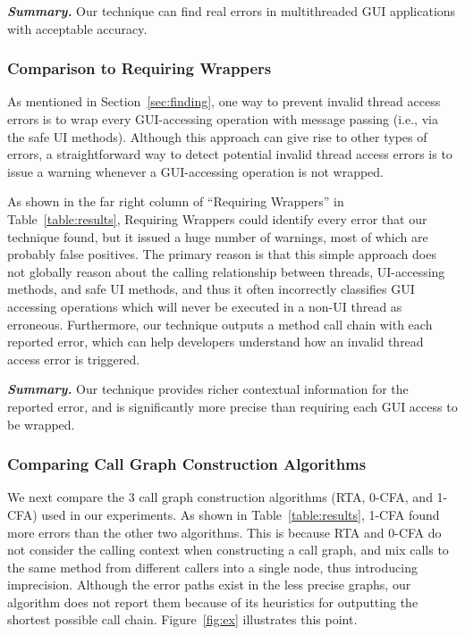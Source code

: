 \vspace{1mm}

\noindent \textbf{\textit{Summary.}} Our technique can find real errors
in multithreaded GUI applications with
acceptable accuracy.

\subsubsection{Comparison to Requiring Wrappers}
\label{sec:straightforward}

As mentioned in Section~\ref{sec:finding}, one way to prevent
invalid thread access errors is to wrap every GUI-accessing operation
with message passing (i.e., via the safe UI methods). Although
this approach can give rise to other types of errors, a
straightforward way to detect potential invalid thread access errors
is to issue a warning whenever a GUI-accessing operation
is not wrapped. 

As shown in the far right column of ``Requiring Wrappers'' in
Table~\ref{table:results}, Requiring Wrappers could identify every
error that our technique found, but it issued a huge number of warnings,
most of which are probably false positives.
The primary reason is that this simple approach
does not globally reason about the calling relationship between
threads, UI-accessing methods, and safe UI methods, and thus it often incorrectly
classifies GUI accessing operations which will never be executed
in a non-UI thread as erroneous. Furthermore, our technique
outputs a method call chain with each reported error, which can help
developers understand how an invalid thread access error is triggered.



\vspace{1mm}

\noindent \textbf{\textit{Summary.}} Our technique provides
richer contextual information for the reported error, and 
is significantly more precise than requiring each GUI
access to be wrapped.

\subsubsection{Comparing Call Graph Construction Algorithms}
\label{sec:reflectionaware}

We next compare the 3 call graph construction algorithms (RTA, 0-CFA, and 1-CFA)
used in our experiments. As shown in Table~\ref{table:results},  1-CFA found
more errors than the other two algorithms. This
is because RTA and 0-CFA do not consider the calling context when
constructing a call graph, and 
mix calls to the same method from different callers into a single node, thus
introducing imprecision. Although the error paths exist in
the less precise graphs, our algorithm does not report them because of its heuristics
for outputting the shortest possible call chain. Figure~\ref{fig:ex} illustrates this point.

